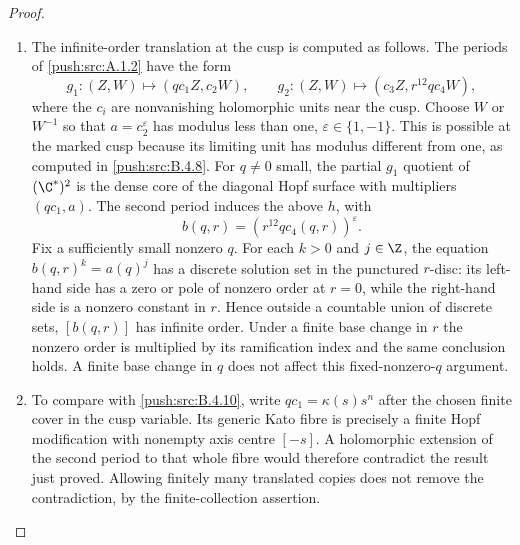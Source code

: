\begin{proof}
\begin{enumerate}[label=\arabic*.,leftmargin=*]
\item The infinite-order translation at the cusp is computed as follows.
The periods of \ref{push:src:A.1.2} have the form
\[
 g_1:(Z,W)\longmapsto(q c_1 Z,c_2W),\qquad
 g_2:(Z,W)\longmapsto(c_3Z,r^{12}q c_4 W),
\]
where the $c_i$ are nonvanishing holomorphic units near the cusp.
Choose $W$ or $W^{-1}$ so that
$a=c_2^{\varepsilon}$ has modulus less than one,
$\varepsilon\in\{1,-1\}$.
This is possible at the marked cusp because its limiting
unit has modulus different from one, as computed in \ref{push:src:B.4.8}.
For $q\ne0$ small, the partial $g_1$ quotient of $(\C^*)^2$
is the dense core of the diagonal Hopf surface with multipliers
$(q c_1,a)$. The second period induces the above $h$, with
\[
 b(q,r)=(r^{12}q c_4(q,r))^{\varepsilon}.
\]
Fix a sufficiently small nonzero $q$. For each $k>0$ and
$j\in\Z$, the equation $b(q,r)^k=a(q)^j$ has a discrete
solution set in the punctured $r$-disc: its left-hand side has
a zero or pole of nonzero order at $r=0$, while the right-hand
side is a nonzero constant in $r$.
Hence outside a countable union of discrete sets, $[b(q,r)]$
has infinite order. Under a finite base change in $r$ the
nonzero order is multiplied by its ramification index and
the same conclusion holds. A finite base change in $q$ does
not affect this fixed-nonzero-$q$ argument.

\item To compare with \ref{push:src:B.4.10}, write $q c_1=\kappa(s)s^n$ after
the chosen finite cover in the cusp variable. Its generic Kato
fibre is precisely a finite Hopf modification with nonempty
axis centre $[-s]$. A holomorphic extension of the second
period to that whole fibre would therefore contradict the result
just proved. Allowing finitely many translated copies does not
remove the contradiction, by the finite-collection assertion.
\end{enumerate}
\end{proof}